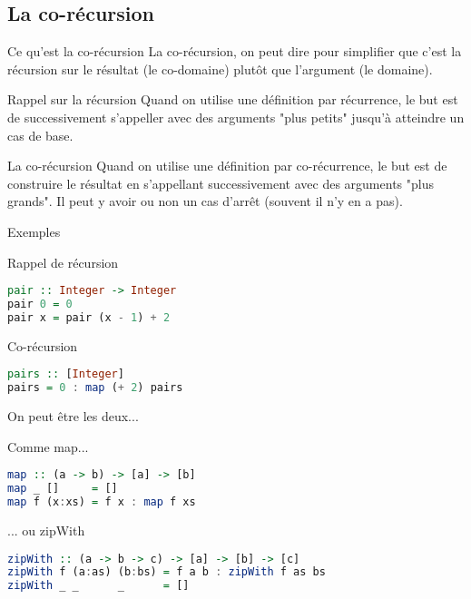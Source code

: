 \documentclass[handout]{beamer}
\begin{document}
 \subsection{La co-récursion}
  \begin{frame}{Ce qu'est la co-récursion}
   La co-récursion, on peut dire pour simplifier que c'est la récursion sur
   le résultat (le co-domaine) plutôt que l'argument (le domaine).
   \begin{block}{Rappel sur la récursion}
    Quand on utilise une définition par récurrence, le but est de successivement
    s'appeller avec des arguments "plus petits" jusqu'à atteindre un cas de
    base.
   \end{block}
   \begin{block}{La co-récursion}
    Quand on utilise une définition par co-récurrence, le but est de construire
    le résultat en s'appellant successivement avec des arguments "plus grands".
    Il peut y avoir ou non un cas d'arrêt (souvent il n'y en a pas).
   \end{block}
  \end{frame}


  \begin{frame}[fragile]{Exemples}
   \begin{block}{Rappel de récursion}
     \begin{lstlisting}[language=Haskell]
pair :: Integer -> Integer
pair 0 = 0
pair x = pair (x - 1) + 2
     \end{lstlisting}
   \end{block}
   \pause
   \begin{block}{Co-récursion}
     \begin{lstlisting}[language=Haskell]
pairs :: [Integer]
pairs = 0 : map (+ 2) pairs
     \end{lstlisting}
   \end{block}
\end{frame}


  \begin{frame}[fragile]{On peut être les deux...}
   \begin{block}{Comme map...}
     \begin{lstlisting}[language=Haskell]
map :: (a -> b) -> [a] -> [b]
map _ []     = []
map f (x:xs) = f x : map f xs
     \end{lstlisting}
   \end{block}
   \pause
   \begin{block}{... ou zipWith}
     \begin{lstlisting}[language=Haskell]
zipWith :: (a -> b -> c) -> [a] -> [b] -> [c]
zipWith f (a:as) (b:bs) = f a b : zipWith f as bs
zipWith _ _      _      = []
     \end{lstlisting}
   \end{block}
\end{frame}
\end{document}
